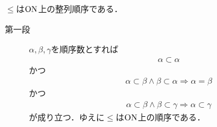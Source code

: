 	\begin{screen}
		\begin{thm}[$\ON$の整列性]\label{thm:On_is_wellordered}
			$\leq$は$\ON$上の整列順序である．
		\end{thm}
	\end{screen}
	
	\begin{prf}\mbox{}
		\begin{description}
			\item[第一段]
				$\alpha,\beta,\gamma$を順序数とすれば
				\begin{align}
					\alpha \subset \alpha
				\end{align}
				かつ
				\begin{align}
					\alpha \subset \beta \wedge \beta \subset \alpha \Longrightarrow \alpha = \beta
				\end{align}
				かつ
				\begin{align}
					\alpha \subset \beta \wedge \beta \subset \gamma \Longrightarrow \alpha \subset \gamma
				\end{align}
				が成り立つ．ゆえに$\leq$は$\ON$上の順序である．
				

\end{description}
\end{prf}
